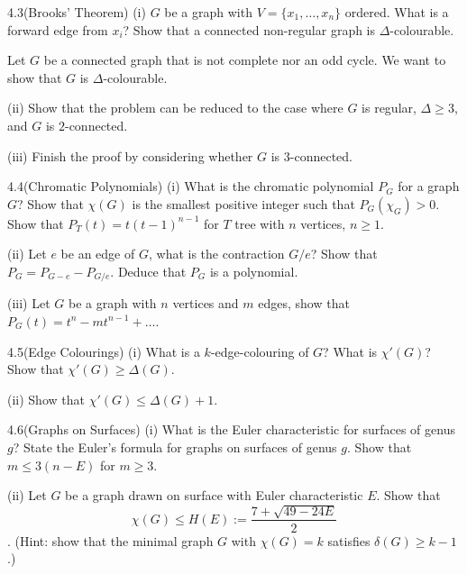 \begin{question}{4.3(Brooks' Theorem)}
	(i) $G$ be a graph with $V = \{x_1,\dots,x_n\}$ ordered. What is a forward edge from $x_i$? Show that a connected non-regular graph is $\Delta$-colourable.
	
	\bigskip
	
	Let $G$ be a connected graph that is not complete nor an odd cycle. We want to show that $G$ is $\Delta$-colourable.
	
	(ii) Show that the problem can be reduced to the case where $G$ is regular, $\Delta \geq 3$, and $G$ is $2$-connected.
	
	(iii) Finish the proof by considering whether $G$ is $3$-connected.
\end{question}

\begin{question}{4.4(Chromatic Polynomials)}
	(i) What is the chromatic polynomial $P_G$ for a graph $G$? Show that $\chi(G)$ is the smallest positive integer such that $P_G(\chi_G) > 0$. Show that $P_T(t) = t(t-1)^{n-1}$ for $T$ tree with $n$ vertices, $n \geq 1$.
	
	(ii) Let $e$ be an edge of $G$, what is the contraction $G/e$? Show that $P_G = P_{G-e} - P_{G/e}$. Deduce that $P_G$ is a polynomial.
	
	(iii) Let $G$ be a graph with $n$ vertices and $m$ edges, show that $P_G(t) = t^n - mt^{n-1}+\dots$.
\end{question}

\begin{question}{4.5(Edge Colourings)}
	(i) What is a $k$-edge-colouring of $G$? What is $\chi'(G)$? Show that $\chi'(G) \geq \Delta(G)$.
	
	(ii) Show that $\chi'(G)\leq \Delta(G) + 1$.
\end{question}

\begin{question}{4.6(Graphs on Surfaces)}
	(i) What is the Euler characteristic for surfaces of genus $g$? State the Euler's formula for graphs on surfaces of genus $g$. Show that $m \leq 3(n - E)$ for $m \geq 3$.
	
	(ii) Let $G$ be a graph drawn on surface with Euler characteristic $E$. Show that \[\chi(G) \leq H(E):= \frac{7 + \sqrt{49-24E}}{2} \]. (Hint: show that the minimal graph $G$ with $\chi(G) = k$ satisfies $\delta(G) \geq k-1$.)
\end{question}

